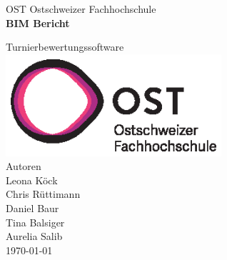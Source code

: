 \documentclass[11pt]{scrartcl}
\begin{document}
    \begin{titlepage}
        \begin{center}
        {\LARGE OST Ostschweizer Fachhochschule}
            \\[1.5cm]
            \linespread{1.2}\huge {\bfseries BIM Bericht}
            
            {\large{Turnierbewertungssoftware}}
            \\[1.5cm]
           \includegraphics[width=8cm]{images/ost_logo.eps}
           \\[1cm]
            {\small{Autoren}}\\
            {\Large{Leona Köck}}\\
            {\Large{Chris Rüttimann}}\\
            {\Large{Daniel Baur}}\\
            {\Large{Tina Balsiger}}\\
            {\Large{Aurelia Salib}}
            \\[1cm]

            \vspace*{\fill}
            \large{\today}
        \end{center}

    \end{titlepage}

    \addtocounter{section}{0}
	
	


\end{document}
